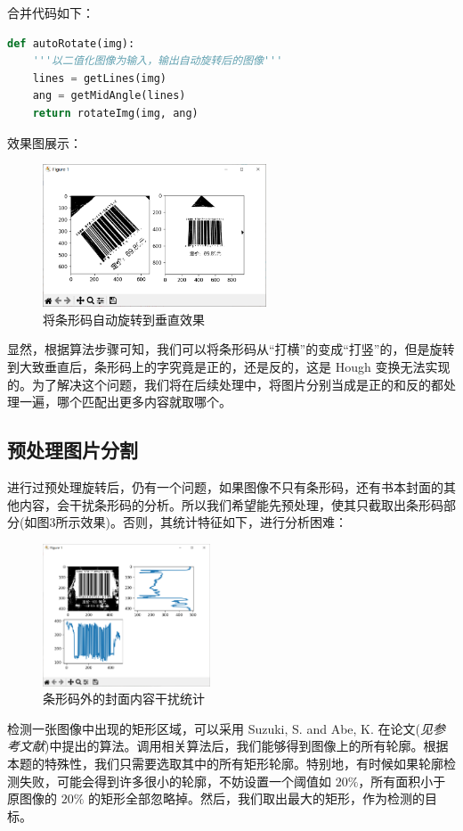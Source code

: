\documentclass{ctexart}
\begin{document}
合并代码如下：
\begin{lstlisting}[language=python]
def autoRotate(img):
    '''以二值化图像为输入，输出自动旋转后的图像'''
    lines = getLines(img)
    ang = getMidAngle(lines)
    return rotateImg(img, ang)
\end{lstlisting}

效果图展示：
\begin{figure}[H]
    \centering
    \includegraphics[height=120pt]{sample_autoRotate}
    \caption{将条形码自动旋转到垂直效果}
\end{figure}

显然，根据算法步骤可知，我们可以将条形码从“打横”的变成“打竖”的，但是旋转到大致垂直后，条形码上的字究竟是正的，还是反的，这是 Hough 变换无法实现的。为了解决这个问题，我们将在后续处理中，将图片分别当成是正的和反的都处理一遍，哪个匹配出更多内容就取哪个。

\subsection{预处理图片分割}
进行过预处理旋转后，仍有一个问题，如果图像不只有条形码，还有书本封面的其他内容，会干扰条形码的分析。所以我们希望能先预处理，使其只截取出条形码部分(如图3所示效果)。否则，其统计特征如下，进行分析困难：
\begin{figure}[H]
    \centering
    \includegraphics[height=120pt]{isbn_beforeCut}
    \caption{条形码外的封面内容干扰统计}
\end{figure}

检测一张图像中出现的矩形区域，可以采用 Suzuki, S. and Abe, K. 在论文(\textit{见参考文献})中提出的算法。调用相关算法后，我们能够得到图像上的所有轮廓。根据本题的特殊性，我们只需要选取其中的所有矩形轮廓。特别地，有时候如果轮廓检测失败，可能会得到许多很小的轮廓，不妨设置一个阈值如 $20\%$，所有面积小于原图像的 $20\%$ 的矩形全部忽略掉。然后，我们取出最大的矩形，作为检测的目标。
\end{document}
